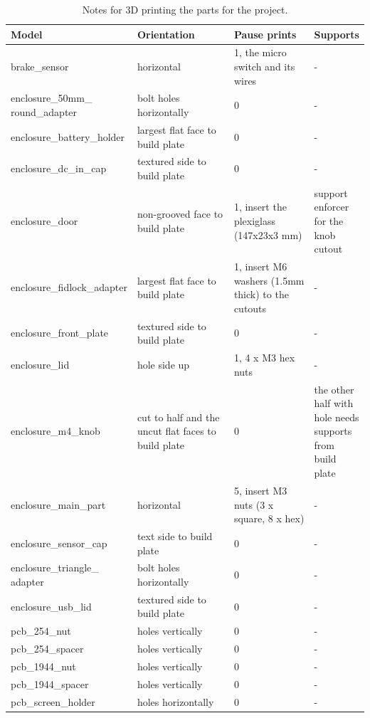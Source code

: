 \documentclass[a4paper,11pt]{article} %
\begin{document}
\begin{longtable}{ |p{0.35\linewidth} | p{0.3\linewidth}| p{0.25\linewidth}| p{0.15\linewidth}|} 
    \caption{Notes for 3D printing the parts for the project.}
    \label{tab:printing}
     \hline
     Model & Orientation & Pause prints & Supports \\ 
     \hline
     \hline
     brake\_sensor & horizontal & 1, the micro switch and its wires & - \\
     \hline
     enclosure\_50mm\_ round\_adapter &	bolt holes horizontally &	0 &	-\\
     \hline
     enclosure\_battery\_holder &	largest flat face to build plate &	0 &	-\\
     \hline
     enclosure\_dc\_in\_cap &	textured side to build plate &	0 &	-\\
     \hline
     enclosure\_door &	non-grooved face to build plate &	1, insert the plexiglass (147x23x3 mm) &	support enforcer for the knob cutout\\
     \hline
     enclosure\_fidlock\_adapter	& largest flat face to build plate &	1, insert M6 washers (1.5mm thick) to the cutouts &	-\\
     \hline
     enclosure\_front\_plate &	textured side to build plate &	0 &	-\\
     \hline
     enclosure\_lid &	hole side up &	1, 4 x M3 hex nuts &	-\\
     \hline
     enclosure\_m4\_knob &	cut to half and the uncut flat faces to build plate &	0 &	the other half with hole needs supports from build plate\\
     \hline
     enclosure\_main\_part &	horizontal &	5, insert M3 nuts (3 x square, 8 x hex) &	- \\
     \hline
     \newpage
     enclosure\_sensor\_cap &	text side to build plate &	0 &	-\\
     \hline
     enclosure\_triangle\_ adapter &	bolt holes horizontally &	0 &	-\\
     \hline
     enclosure\_usb\_lid &	textured side to build plate &	0 &	-\\
     \hline
     pcb\_254\_nut &	holes vertically &	0 &	-\\
     \hline
     pcb\_254\_spacer &	holes vertically &	0 &	-\\
     \hline
     pcb\_1944\_nut &	holes vertically &	0 &	-\\
     \hline
     pcb\_1944\_spacer &	holes vertically &	0 &	-\\
     \hline
     pcb\_screen\_holder &	holes horizontally &	0 &	-\\

\end{longtable}
\end{document}
